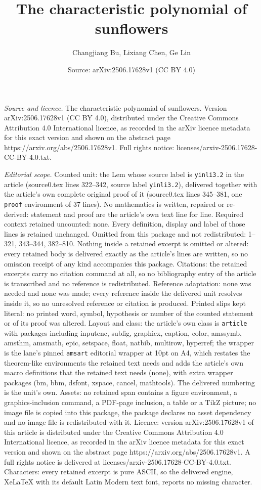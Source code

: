 \documentclass[10pt,a4paper]{amsart}
\title[The characteristic polynomial of sunflowers]{The characteristic polynomial of sunflowers}
\author{Changjiang Bu, Lixiang Chen, Ge Lin}
\date{Source: arXiv:2506.17628v1 (CC BY 4.0)}
\begin{document}
\maketitle

\noindent\emph{Source and licence.} The characteristic polynomial of sunflowers. Version arXiv:2506.17628v1 (CC BY 4.0), distributed under the Creative Commons Attribution 4.0 International licence, as recorded in the arXiv licence metadata for this exact version and shown on the abstract page https://arxiv.org/abs/2506.17628v1. Full rights notice: licenses/arxiv-2506.17628-CC-BY-4.0.txt.\par\smallskip

\noindent\textit{Editorial scope.} Counted unit: the Lem whose source label is \texttt{yinli3.2} in the article (source0.tex lines 322--342, source label \texttt{yinli3.2}), delivered together with the article's own complete original proof of it (source0.tex lines 345--381, one \texttt{proof} environment of 37 lines). No mathematics is written, repaired or re-derived: statement and proof are the article's own text line for line. Required context retained uncounted: none. Every definition, display and label of those lines is retained unchanged. Omitted from this package and not redistributed: 1--321, 343--344, 382--810. Nothing inside a retained excerpt is omitted or altered: every retained body is delivered exactly as the article's lines are written, so no omission receipt of any kind accompanies this package. Citations: the retained excerpts carry no citation command at all, so no bibliography entry of the article is transcribed and no reference is redistributed. Reference adaptation: none was needed and none was made; every reference inside the delivered unit resolves inside it, so no unresolved reference or citation is produced. Printed slips kept literal: no printed word, symbol, hypothesis or number of the counted statement or of its proof was altered. Layout and class: the article's own class is \texttt{article} with packages including inputenc, subfig, graphicx, caption, color, amssymb, amsthm, amsmath, epic, setspace, float, natbib, multirow, hyperref; the wrapper is the lane's pinned \texttt{amsart} editorial wrapper at 10pt on A4, which restates the theorem-like environments the retained text needs and adds the article's own macro definitions that the retained text needs (none), with extra wrapper packages (bm, bbm, dsfont, xspace, cancel, mathtools). The delivered numbering is the unit's own. Assets: no retained span contains a figure environment, a graphics-inclusion command, a PDF-page inclusion, a table or a TikZ picture; no image file is copied into this package, the package declares no asset dependency and no image file is redistributed with it. Licence: version arXiv:2506.17628v1 of this article is distributed under the Creative Commons Attribution 4.0 International licence, as recorded in the arXiv licence metadata for this exact version and shown on the abstract page https://arxiv.org/abs/2506.17628v1. A full rights notice is delivered at licenses/arxiv-2506.17628-CC-BY-4.0.txt. Characters: every retained excerpt is pure ASCII, so the delivered engine, XeLaTeX with its default Latin Modern text font, reports no missing character.
\end{document}
